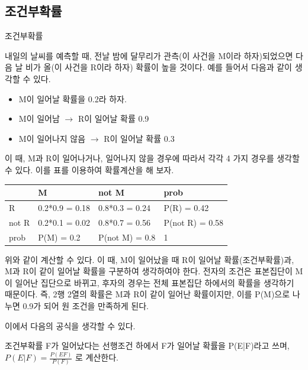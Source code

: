 \documentclass{beamer}
\begin{document}
\subsection{조건부확률} 

\begin{frame}[allowframebreaks]{조건부확률}

내일의 날씨를 예측할 때, 전날 밤에 달무리가 관측(이 사건을 M이라 하자)되었으면   다음 날 비가 올(이 사건을 R이라 하자) 확률이 높을 것이다. 예를 들어서 다음과 같이 생각할 수 있다. 

\begin{itemize} 
\item M이 일어날 확률을 0.2라 하자. 
\item M이 일어남 $\rightarrow$ R이 일어날 확률 0.9
\item M이 일어나지 않음 $\rightarrow$ R이 일어날 확률 0.3
\end{itemize}

\framebreak

이 때, M과 R이 일어나거나, 일어나지 않을 경우에 따라서 각각 4 가지 경우를 생각할 수 있다. 이를 표를 이용하여 확률계산을 해 보자.

\begin{table}[]
\begin{tabular}{|l|l|l|l|}
\hline
      & M              & not M          & prob \\ \hline
R     & 0.2*0.9 = 0.18 & 0.8*0.3 = 0.24 & P(R) = 0.42 \\ \hline
not R & 0.2*0.1 = 0.02 & 0.8*0.7 = 0.56 & P(not R) = 0.58 \\ \hline
prob  & P(M) = 0.2     & P(not M) = 0.8            & 1    \\ \hline
\end{tabular}
\end{table}

위와 같이 계산할 수 있다. 이 때, M이 일어났을 때 R이 일어날 확률(조건부확률)과, M과 R이 같이 일어날 확률을 구분하여 생각하여야 한다. 전자의 조건은 표본집단이 M이 일어난 집단으로 바뀌고, 후자의 경우는 전체 표본집단 하에서의 확률을 생각하기 때문이다. 즉, 2행 2열의 확률은 M과 R이 같이 일어난 확률이지만, 이를 P(M)으로 나누면 0.9가 되어 원 조건을 만족하게 된다. 


\framebreak
이에서 다음의 공식을 생각할 수 있다. 

\begin{block}{조건부확률}
F가 일어났다는 선행조건 하에서 F가 일어날 확률을 P(E|F)라고 쓰며, $P(E|F) = \frac{P(E  F)}{P(F)}$ 로 계산한다. 
\end{block}


\end{frame}
\end{document}
